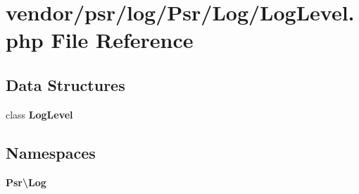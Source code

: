 \section{vendor/psr/log/\+Psr/\+Log/\+Log\+Level.php File Reference}
\label{_log_level_8php}
\subsection*{Data Structures}
\begin{DoxyCompactItemize}
\item 
class {\bf Log\+Level}
\end{DoxyCompactItemize}
\subsection*{Namespaces}
\begin{DoxyCompactItemize}
\item 
 {\bf Psr\textbackslash{}\+Log}
\end{DoxyCompactItemize}
